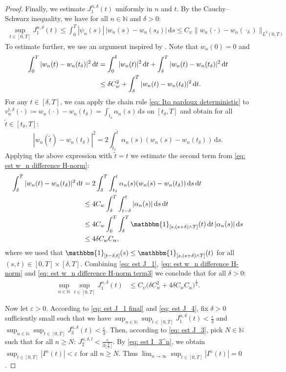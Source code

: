 \documentclass{amsart}
\newcommand{\dd}{\,\mathrm{d}}
\newcommand{\one}{\mathbbm{1}}
\newcommand{\<}{\langle}
\newcommand{\?}{\rangle}
\theoremstyle{plain}
\theoremstyle{remark}
\theoremstyle{plain}
\numberwithin{equation}{section}
\def\N{{\mathbb N}}
\newcommand{\eps}{\varepsilon}
\begin{document}
\begin{proof}
Finally, we estimate $J_1^{n,\delta}(t)$ uniformly in $n$ and $t$. By the Cauchy--Schwarz inequality, we have for all $n \in\N$ and $\delta>0$:
\begin{align}\label{eq: est J_1}
  \sup_{t\in[0,T]}J_1^{n,\delta}(t)
  \leq \int_0^T |\psi_n(s)|\,|w_n(s)-w_n(s_\delta)|\dd s
  \leq C_\psi\|w_n(\cdot)-w_n(\cdot_\delta)\|_{L^2(0,T)}
\end{align}
To estimate further, we use an argument inspired by \cite[Lem. 3.3]{hongliliu21}. Note that $w_n(0)=0$ and
\begin{align}\label{eq: est w_n difference H-norm}
 \int_0^T |w_n(t)-w_n(t_\delta)|^2 \dd t&= \int_0^\delta |w_n(t)|^2 \dd t+\int_\delta^T |w_n(t)-w_n(t_\delta)|^2 \dd t \notag\\
 &\leq \delta C_w^2+\int_\delta^T |w_n(t)-w_n(t_\delta)|^2 \dd t.
\end{align}
For any $t\in[\delta,T]$, we can apply the chain rule \eqref{eq: Ito pardoux deterministic}
to $v_n^{t,\delta}(\cdot)\coloneqq w_n(\cdot)-w_n(t_\delta)=\int_{t_\delta}^\cdot \alpha_n(s)\dd s$ on $[t_\delta,T]$ and obtain for all $\tilde{t}\in[t_\delta,T]$:
\[
|w_n(\tilde{t})-w_n(t_\delta)|^2=2\int_{t_\delta}^{\tilde{t}}\alpha_n(s)(w_n(s)-w_n(t_\delta))\dd s.
\]
Applying the above expression with $\tilde{t}=t$ we estimate the second term from \eqref{eq: est w_n difference H-norm}:
\begin{align}\label{eq: est w_n difference H-norm term3}
 \int_\delta^T |w_n(t)-w_n(t_\delta)|^2  \dd t &=2\int_\delta^T \int_{t_\delta}^{t}\alpha_n(s)(w_n(s)-w_n(t_\delta))\dd s\dd t\notag\\
  &\leq 4C_w \int_\delta^T \int_{t-\delta}^{t}|\alpha_n(s)|\dd s\dd t\notag\\
  &\leq 4C_w\int_0^{T}\int_\delta^T  \one_{[s,(s+\delta)\wedge T]}(t)\dd t \, |\alpha_n(s)|\dd s\notag\\
  &\leq 4\delta C_wC_\alpha,
\end{align}
where we used that $\one_{[t-\delta,t]}(s)\leq \one_{[s,(s+\delta)\wedge T]}(t)$ for all $(s,t)\in[0,T]\times[\delta,T]$.
Combining \eqref{eq: est J_1}, \eqref{eq: est w_n difference H-norm} and \eqref{eq: est w_n difference H-norm term3} we conclude that for all $\delta>0$:
\begin{align}\label{eq: est J_1 final}
  \sup_{n\in\N}\sup_{t\in[0,T]}J_1^{n,\delta}(t)&\leq C_\psi\big(\delta C_w^2+4\delta C_w C_\alpha\big)^{\frac{1}{2}}.
\end{align}


Now let $\eps>0$.
According to \eqref{eq: est J_1 final} and \eqref{eq: est J_4}, fix $\delta>0$ sufficiently small such that we have
$\sup_{n\in\N}\sup_{t\in[0,T]}J_1^{n,\delta}(t)<\frac{\eps}{3}$ and $\sup_{n\in\N}\sup_{t\in[0,T]}J_3^{n,\delta}(t)<\frac{\eps}{3}.
$
Then, according to \eqref{eq: est J_3}, pick $N\in\N$ such that for all $n\geq N$: $J_2^{n,\delta,l}<\frac{\eps}{3\lfloor \frac{T}{\delta}\rfloor}$.
By \eqref{eq: est I_3^n}, we obtain $\sup_{t\in[0,T]}|I^n(t)|<\eps$ for all $n\geq N$. Thus  $\lim_{n\to\infty}\sup_{t\in[0,T]}|I^n(t)|=0$.
\end{proof}
\end{document}
